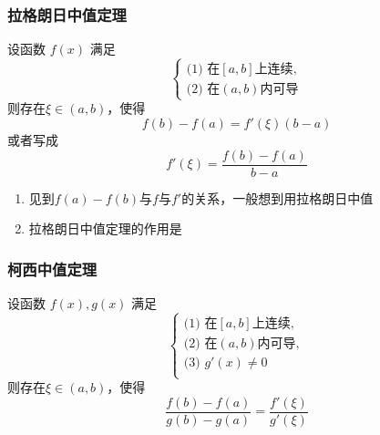 \documentclass[a4paper,12pt]{article}
\begin{document}
\begin{enumerate}
\begin{itemize}
\begin{circlenum}
                \item $\displaystyle\frac{f''(x)f(x) - [f'(x)]^2}{f^{2}(x)} = [\displaystyle\frac{f'(x)}{f(x)}]'$ \\ $\Rightarrow$见到$f''(x)f(x) - [f'(x)]^2, f(x) \neq 0$，令$F(x) = \displaystyle\frac{f'(x)}{f(x)}$
                \item $\displaystyle\frac{f'(x)}{f(x)} = [\ln f(x)]'$
                \item {\setlength{\baselineskip}{1.4\baselineskip} $\displaystyle\frac{f''(x)f(x) - [f'(x)]^2}{f^2(x)} = [\displaystyle\frac{f'(x)}{f(x)}]' = [\ln f(x)]''$ \\ $\Rightarrow$见到 $f''(x)f(x) - [f'(x)]^2, f(x) > 0$，可考虑令$F(x) = \ln f(x)$
            \end{circlenum}
        \end{itemize}
    \end{enumerate}

    \subsubsection{拉格朗日中值定理}

    设函数 $f(x)$ 满足
    \[
        \begin{cases}
            \text{(1) 在} [a, b] \text{上连续},\\
            \text{(2) 在} (a, b) \text{内可导}
        \end{cases}
    \]
    则存在$\xi \in (a, b)$，使得
    \[
        f(b) - f(a) = f'(\xi)(b - a)
    \]
    或者写成
    \[
        f'(\xi) = \frac{f(b) - f(a)}{b - a}
    \]

    \begin{enumerate}
        \item 见到$f(a) - f(b)$与$f$与$f'$的关系，一般想到用拉格朗日中值
        \item 拉格朗日中值定理的作用是{\color{red}{用导函数的值来控制函数值的增减}}
    \end{enumerate}

    \subsubsection{柯西中值定理}

    设函数 $f(x), g(x)$ 满足
    \[
        \begin{cases}
            \text{(1) 在} [a, b] \text{上连续},\\
            \text{(2) 在} (a, b) \text{内可导},\\
            \text{(3) } g'(x) \neq 0 \\
        \end{cases}
    \]
    则存在$\xi \in (a, b)$，使得
    \[
        \frac{f(b) - f(a)}{g(b) - g(a)} = \frac{f'(\xi)}{g'(\xi)}
    \]
\end{document}
